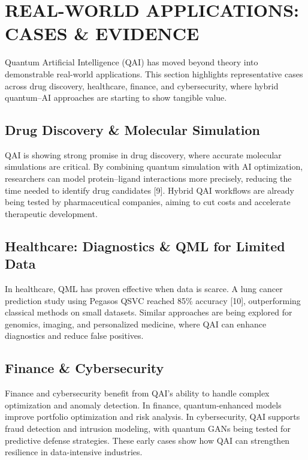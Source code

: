 \chapter{REAL-WORLD APPLICATIONS: CASES \& EVIDENCE}

\hspace*{0.3in}Quantum Artificial Intelligence (QAI) has moved beyond theory into demonstrable real-world applications. This section highlights representative cases across drug discovery, healthcare, finance, and cybersecurity, where hybrid quantum–AI approaches are starting to show tangible value.

\section{Drug Discovery \& Molecular Simulation}
\hspace*{0.3in}QAI is showing strong promise in drug discovery, where accurate molecular simulations are critical. By combining quantum simulation with AI optimization, researchers can model protein–ligand interactions more precisely, reducing the time needed to identify drug candidates [9]. Hybrid QAI workflows are already being tested by pharmaceutical companies, aiming to cut costs and accelerate therapeutic development.
\section{Healthcare: Diagnostics \& QML for Limited Data}
\hspace*{0.3in}In healthcare, QML has proven effective when data is scarce. A lung cancer prediction study using Pegasos QSVC reached 85\% accuracy [10], outperforming classical methods on small datasets. Similar approaches are being explored for genomics, imaging, and personalized medicine, where QAI can enhance diagnostics and reduce false positives.
\section{Finance \& Cybersecurity}
\hspace*{0.3in}Finance and cybersecurity benefit from QAI’s ability to handle complex optimization and anomaly detection. In finance, quantum-enhanced models improve portfolio optimization and risk analysis. In cybersecurity, QAI supports fraud detection and intrusion modeling, with quantum GANs being tested for predictive defense strategies. These early cases show how QAI can strengthen resilience in data-intensive industries.